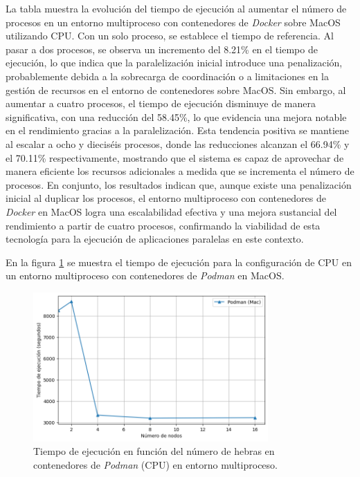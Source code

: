 La tabla muestra la evolución del tiempo de ejecución al aumentar el número de procesos en un entorno multiproceso con contenedores de \textit{Docker} sobre MacOS utilizando CPU. Con un solo proceso, se establece el tiempo de referencia. Al pasar a dos procesos, se observa un incremento del 8.21\% en el tiempo de ejecución, lo que indica que la paralelización inicial introduce una penalización, probablemente debida a la sobrecarga de coordinación o a limitaciones en la gestión de recursos en el entorno de contenedores sobre MacOS. Sin embargo, al aumentar a cuatro procesos, el tiempo de ejecución disminuye de manera significativa, con una reducción del 58.45\%, lo que evidencia una mejora notable en el rendimiento gracias a la paralelización. Esta tendencia positiva se mantiene al escalar a ocho y dieciséis procesos, donde las reducciones alcanzan el 66.94\% y el 70.11\% respectivamente, mostrando que el sistema es capaz de aprovechar de manera eficiente los recursos adicionales a medida que se incrementa el número de procesos. En conjunto, los resultados indican que, aunque existe una penalización inicial al duplicar los procesos, el entorno multiproceso con contenedores de \textit{Docker} en MacOS logra una escalabilidad efectiva y una mejora sustancial del rendimiento a partir de cuatro procesos, confirmando la viabilidad de esta tecnología para la ejecución de aplicaciones paralelas en este contexto.

En la figura \ref{fig:multi-node_mac_podman_time} se muestra el tiempo de ejecución para la configuración de CPU en un entorno multiproceso con contenedores de \textit{Podman} en MacOS.

\begin{figure}[ht]
    \centering
    \includegraphics[width=0.8\textwidth]{imagenes/cap5/multi-node_mac_podman_time.png}
    \caption{Tiempo de ejecución en función del número de hebras en contenedores de \textit{Podman} (CPU) en entorno multiproceso.}
    \label{fig:multi-node_mac_podman_time}
\end{figure}


